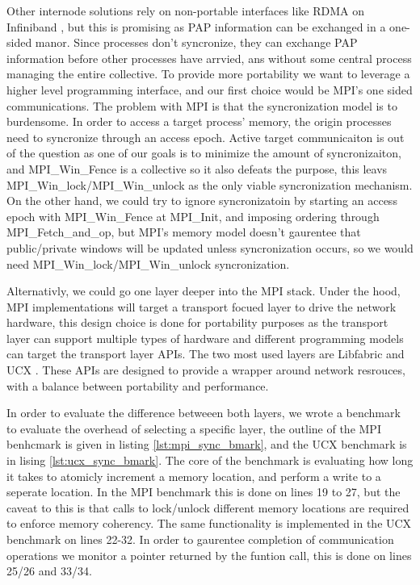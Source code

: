 Other internode solutions rely on non-portable interfaces like RDMA on Infiniband \cite{Qian2009ProcArrivalSHMA2AIB}, but this is promising as PAP information can be exchanged in a one-sided manor.
Since processes don't syncronize, they can exchange PAP information before other processes have arrvied, ans without some central process managing the entire collective. 
To provide more portability we want to leverage a higher level programming interface, and our first choice would be MPI's one sided communications.
The problem with MPI is that the syncronization model is to burdensome. 
In order to access a target process' memory, the origin processes need to syncronize through an access epoch. 
Active target communicaiton is out of the question as one of our goals is to minimize the amount of syncronizaiton, and MPI\_Win\_Fence is a collective so it also defeats the purpose, this leavs  MPI\_Win\_lock/MPI\_Win\_unlock as the only viable syncronization mechanism.
On the other hand, we could try to ignore syncronizatoin by starting an access epoch with MPI\_Win\_Fence at MPI\_Init, and imposing ordering through MPI\_Fetch\_and\_op, but MPI's memory model doesn't gaurentee that public/private windows will be updated unless syncronization occurs, so we would need MPI\_Win\_lock/MPI\_Win\_unlock syncronization.

Alternativly, we could go one layer deeper into the MPI stack. 
Under the hood, MPI implementations will target a transport focued layer to drive the network hardware, this design choice is done for portability purposes as the transport layer can support multiple types of hardware and different programming models can target the transport layer APIs.
The two most used layers are Libfabric and UCX \cite{libfabric, shamis2015ucx}.
These APIs are designed to provide a wrapper around network resrouces, with a balance between portability and performance.

In order to evaluate the difference betweeen both layers, we wrote a benchmark to evaluate the overhead of selecting a specific layer, the outline of the MPI benhcmark is given in listing \ref{lst:mpi_sync_bmark}, and the UCX benchmark is in lising \ref{lst:ucx_sync_bmark}.
The core of the benchmark is evaluating how long it takes to atomicly increment a memory location, and perform a write to a seperate location.
In the MPI benchmark this is done on lines 19 to 27, but the caveat to this is that calls to lock/unlock different memory locations are required to enforce memory coherency.
The same functionality is implemented in the UCX benchmark on lines 22-32.
In order to gaurentee completion of communication operations we monitor a pointer returned by the funtion call, this is done on lines 25/26 and 33/34.

